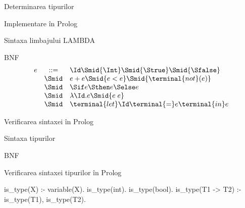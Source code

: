 \documentclass[xcolor=x11names,compress,10pt]{beamer}
\begin{document}
\begin{section}{Determinarea tipurilor}
\begin{subsection}{Implementare în Prolog}
  \begin{frame}[fragile]{Sintaxa limbajului LAMBDA}
    \begin{block}{BNF}
    \[
    \begin{array}{rcl}
      e & ::= & {\Id} \Smid {\Int} \Smid {\Strue} \Smid {\Sfalse} \\
        & \Smid & {e + e} \Smid {e < e} \Smid { \terminal{not}(e) } \\
        & \Smid & \Sif e \Sthen e \Selse e \\
        & \Smid & {\lambda \Id . e} \Smid {e \; e} \\
        & \Smid & \terminal{let} \Id \terminal{=} e \terminal{in} e
    \end{array}
    \]
    \end{block}

    \begin{block}{Verificarea sintaxei în Prolog}
    \end{block}
 \end{frame}

  \begin{frame}[fragile]{Sintaxa tipurilor }
    \begin{block}{BNF}
 \begin{syntaxBlock}{\structure{\tau}}
 \vspace{-4ex}
 \end{syntaxBlock}
\end{block}

    \begin{block}{Verificarea sintaxei tipurilor în Prolog}
      \begin{asciipl}
is_type(X) :- variable(X).     %
is_type(int).                  %
is_type(bool).                 %
is_type(T1 -> T2) :-           %
   is_type(T1), is_type(T2).
      \end{asciipl}
    \end{block}
\end{frame}


\end{subsection}
\end{section}
\end{document}
